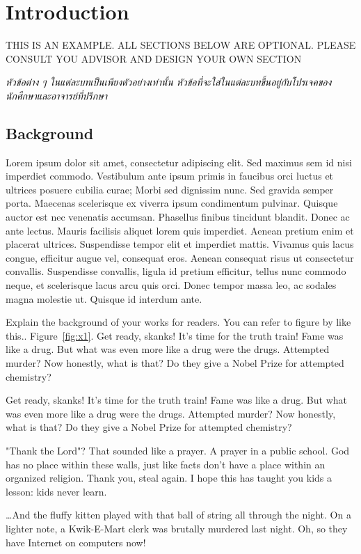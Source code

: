 \chapter{Introduction}

THIS IS AN EXAMPLE. ALL SECTIONS BELOW ARE OPTIONAL. PLEASE CONSULT YOU ADVISOR AND DESIGN YOUR OWN SECTION

\emph{\textthai{หัวข้อต่าง ๆ ในแต่ละบทเป็นเพียงตัวอย่างเท่านั้น หัวข้อที่จะใส่ในแต่ละบทขึ้นอยู่กับโปรเจคของนักศึกษาและอาจารย์ที่ปรึกษา}}

\section{Background} 

Lorem ipsum dolor sit amet, consectetur adipiscing elit. Sed maximus sem id nisi imperdiet commodo. Vestibulum ante ipsum primis in faucibus orci luctus et ultrices posuere cubilia curae; Morbi sed dignissim nunc. Sed gravida semper porta. Maecenas scelerisque ex viverra ipsum condimentum pulvinar. Quisque auctor est nec venenatis accumsan. Phasellus finibus tincidunt blandit. Donec ac ante lectus. Mauris facilisis aliquet lorem quis imperdiet. Aenean pretium enim et placerat ultrices. Suspendisse tempor elit et imperdiet mattis. Vivamus quis lacus congue, efficitur augue vel, consequat eros. Aenean consequat risus ut consectetur convallis. Suspendisse convallis, ligula id pretium efficitur, tellus nunc commodo neque, et scelerisque lacus arcu quis orci. Donec tempor massa leo, ac sodales magna molestie ut. Quisque id interdum ante.

Explain the background of your works for readers. You can refer to figure by like this.. Figure~\ref{fig:x1}.
Get ready, skanks! It's time for the truth train! Fame was like a drug. But what was even more like a drug were the drugs. Attempted murder? Now honestly, what is that? Do they give a Nobel Prize for attempted chemistry?

Get ready, skanks! It's time for the truth train! Fame was like a drug. But what was even more like a drug were the drugs. Attempted murder? Now honestly, what is that? Do they give a Nobel Prize for attempted chemistry?

"Thank the Lord"? That sounded like a prayer. A prayer in a public school. God has no place within these walls, just like facts don't have a place within an organized religion. Thank you, steal again. I hope this has taught you kids a lesson: kids never learn.

…And the fluffy kitten played with that ball of string all through the night. On a lighter note, a Kwik-E-Mart clerk was brutally murdered last night. Oh, so they have Internet on computers now!

